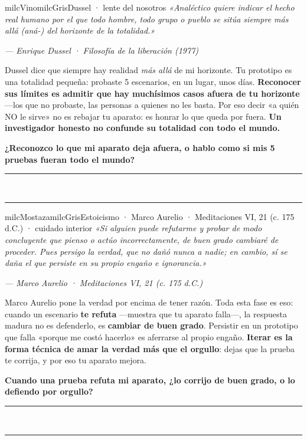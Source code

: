 \documentclass[11pt,letterpaper]{article}
\newcommand{\linead}[1]{\noindent\color{milcLinea}\rule{#1}{0.5pt}\color{milcNegro}}
\begin{document}
\begin{softbox}{milcVino}{milcGris}{Dussel · lente del nosotros}
\textit{«Analéctico quiere indicar el hecho real humano por el que todo hombre, todo grupo o pueblo se sitúa siempre más allá (aná-) del horizonte de la totalidad.»}

{\footnotesize\itshape\color{milcNegro!70}--- Enrique Dussel · Filosofía de la liberación (1977)}

Dussel dice que siempre hay realidad \emph{más allá} de mi horizonte. Tu prototipo es una totalidad pequeña: probaste 5 escenarios, en un lugar, unos días. \textbf{Reconocer sus límites es admitir que hay muchísimos casos afuera de tu horizonte} ---los que no probaste, las personas a quienes no les basta. Por eso decir «a quién NO le sirve» no es rebajar tu aparato: es honrar lo que queda por fuera. \textbf{Un investigador honesto no confunde su totalidad con todo el mundo.}

\textbf{¿Reconozco lo que mi aparato deja afuera, o hablo como si mis 5 pruebas fueran todo el mundo?}
\end{softbox}
\linead{\linewidth}\\[1mm]
\linead{\linewidth}

\begin{softbox}{milcMostaza}{milcGris}{Estoicismo · Marco Aurelio · Meditaciones VI, 21 (c. 175 d.C.) · cuidado interior}
\textit{«Si alguien puede refutarme y probar de modo concluyente que pienso o actúo incorrectamente, de buen grado cambiaré de proceder. Pues persigo la verdad, que no dañó nunca a nadie; en cambio, sí se daña el que persiste en su propio engaño e ignorancia.»}

{\footnotesize\itshape\color{milcNegro!70}--- Marco Aurelio · Meditaciones VI, 21 (c. 175 d.C.)}

Marco Aurelio pone la verdad por encima de tener razón. Toda esta fase es eso: cuando un escenario \textbf{te refuta} ---muestra que tu aparato falla---, la respuesta madura no es defenderlo, es \textbf{cambiar de buen grado}. Persistir en un prototipo que falla «porque me costó hacerlo» es aferrarse al propio engaño. \textbf{Iterar es la forma técnica de amar la verdad más que el orgullo}: dejas que la prueba te corrija, y por eso tu aparato mejora.

\textbf{Cuando una prueba refuta mi aparato, ¿lo corrijo de buen grado, o lo defiendo por orgullo?}
\end{softbox}
\linead{\linewidth}\\[1mm]
\linead{\linewidth}
\end{document}
